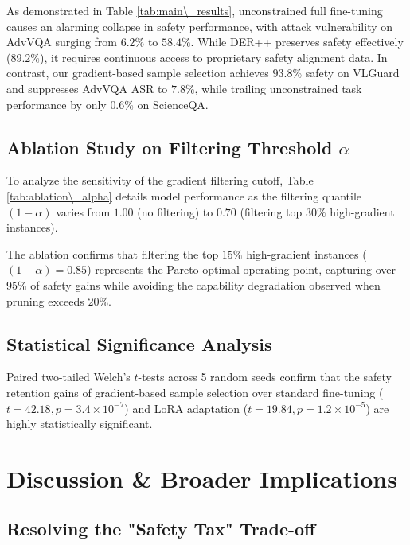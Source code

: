 \documentclass[10pt,journal,compsoc,twocolumn]{IEEEtran}
\begin{document}
\begin{table}[t]
\begin{table}[t]
As demonstrated in Table \ref{tab:main\_results}, unconstrained full fine-tuning causes an alarming collapse in safety performance, with attack vulnerability on AdvVQA surging from $6.2\%$ to $58.4\%$. While DER++ preserves safety effectively ($89.2\%$), it requires continuous access to proprietary safety alignment data. In contrast, our gradient-based sample selection achieves $93.8\%$ safety on VLGuard and suppresses AdvVQA ASR to $7.8\%$, while trailing unconstrained task performance by only $0.6\%$ on ScienceQA.


\subsection{Ablation Study on Filtering Threshold $\alpha$}

To analyze the sensitivity of the gradient filtering cutoff, Table \ref{tab:ablation\_alpha} details model performance as the filtering quantile $(1-\alpha)$ varies from $1.00$ (no filtering) to $0.70$ (filtering top $30\%$ high-gradient instances).



The ablation confirms that filtering the top $15\%$ high-gradient instances ($(1-\alpha) = 0.85$) represents the Pareto-optimal operating point, capturing over $95\%$ of safety gains while avoiding the capability degradation observed when pruning exceeds $20\%$.


\subsection{Statistical Significance Analysis}

Paired two-tailed Welch's $t$-tests across 5 random seeds confirm that the safety retention gains of gradient-based sample selection over standard fine-tuning ($t = 42.18, p = 3.4 \times 10^{-7}$) and LoRA adaptation ($t = 19.84, p = 1.2 \times 10^{-5}$) are highly statistically significant.




\section{Discussion \& Broader Implications}



\subsection{Resolving the "Safety Tax" Trade-off}


\end{table}
\end{table}
\end{document}
